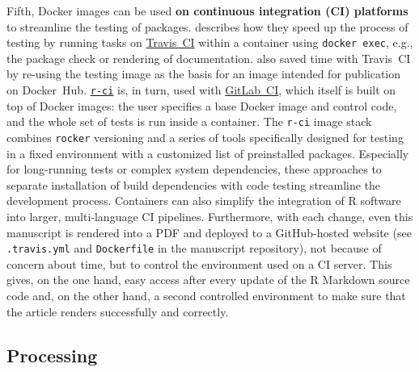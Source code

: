 \label{ci} Fifth, Docker images can be used \textbf{on continuous
integration (CI) platforms} to streamline the testing of packages.
\citet{ye_docker_2019} describes how they speed up the process of
testing by running tasks on \href{https://travis-ci.org/}{Travis~CI}
within a container using \texttt{docker\ exec}, e.g., the package check
or rendering of documentation. \citet{cardozo_faster_2018} also saved
time with Travis~CI by re-using the testing image as the basis for an
image intended for publication on Docker~Hub.
\href{https://github.com/ColinFay/r-ci}{\texttt{r-ci}} is, in turn, used
with \href{https://docs.gitlab.com/ee/ci/}{GitLab~CI}, which itself is
built on top of Docker images: the user specifies a base Docker image
and control code, and the whole set of tests is run inside a container.
The \texttt{r-ci} image stack combines \texttt{rocker} versioning and a
series of tools specifically designed for testing in a fixed environment
with a customized list of preinstalled packages. Especially for
long-running tests or complex system dependencies, these approaches to
separate installation of build dependencies with code testing streamline
the development process. Containers can also simplify the integration of
R software into larger, multi-language CI pipelines. Furthermore, with
each change, even this manuscript is rendered into a PDF and deployed to
a GitHub-hosted website (see \texttt{.travis.yml} and
\texttt{Dockerfile} in the manuscript repository), not because of
concern about time, but to control the environment used on a CI server.
This gives, on the one hand, easy access after every update of the R
Markdown source code and, on the other hand, a second controlled
environment to make sure that the article renders successfully and
correctly.

\hypertarget{processing}{%
\subsection{Processing}\label{processing}}

